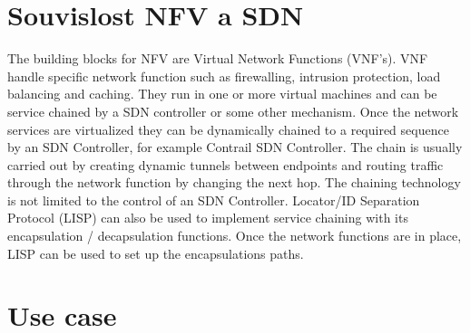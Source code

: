 \section{Souvislost NFV a SDN}\label{sub:interaction}

The building blocks for NFV are Virtual Network Functions (VNF’s). VNF handle specific network function such as firewalling, intrusion protection, load balancing and caching. They run in one or more virtual machines and can be service chained by a SDN controller or some other mechanism. Once the network services are virtualized they can be dynamically chained to a required sequence by an SDN Controller, for example Contrail SDN Controller. The chain is usually carried out by creating dynamic tunnels between endpoints and routing traffic through the network function by changing the next hop. The chaining technology is not limited to the control of an SDN Controller. Locator/ID Separation Protocol (LISP) can also be used to implement service chaining with its encapsulation / decapsulation functions. Once the network functions are in place, LISP can be used to set up the encapsulations paths.

\section{Use case}





